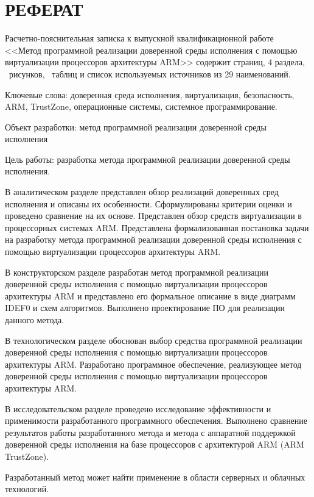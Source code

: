 \section*{РЕФЕРАТ}

Расчетно-пояснительная записка к выпускной квалификационной работе <<Метод программной реализации доверенной среды исполнения с помощью виртуализации процессоров архитектуры ARM>> содержит \pageref{LastPage} страниц, 4 раздела, \totalfigures\ рисунков, \totaltables\ таблиц и список используемых источников из 29 наименований.

Ключевые слова: доверенная среда исполнения, виртуализация, безопасность, ARM, TrustZone, операционные системы, системное программирование.

Объект разработки: метод программной реализации доверенной среды исполнения

Цель работы: разработка метода программной реализации доверенной среды исполнения.
 
В аналитическом разделе представлен обзор реализаций доверенных сред исполнения и описаны их особенности. Сформулированы критерии оценки и проведено сравнение на их основе. Представлен обзор средств виртуализации в процессорных системах ARM. Представлена формализованная постановка задачи на разработку метода программной реализации доверенной среды исполнения с помощью виртуализации процессоров архитектуры ARM.

В конструкторском разделе разработан метод программной реализации доверенной среды исполнения с помощью виртуализации процессоров архитектуры ARM и представлено его формальное описание в виде диаграмм IDEF0 и схем алгоритмов. Выполнено проектирование ПО для реализации данного метода.

В технологическом разделе обоснован выбор средства программной реализации доверенной среды исполнения с помощью виртуализации процессоров архитектуры ARM. Разработано программное обеспечение, реализующее метод доверенной среды исполнения с помощью виртуализации процессоров архитектуры ARM.

В исследовательском разделе проведено исследование эффективности и применимости разработанного программного обеспечения. Выполнено сравнение результатов работы разработанного метода и метода с аппаратной поддержкой доверенной среды исполнения на базе процессоров с архитектурой ARM (ARM TrustZone).

Разработанный метод может найти применение в области серверных и облачных технологий.

\pagebreak

